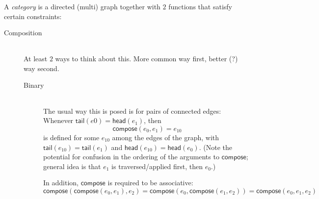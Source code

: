 \documentclass[11pt,openany]{article}
\begin{document}
A \textit{category} is a directed (multi) graph 
together with $2$ functions that satisfy certain constraints:
\begin{description}
\item[Composition]\mbox{}\\
At least $2$ ways to think about this. 
More common way first, better (?) way second.
\begin{description}
\item[Binary]\mbox{}\\
The usual way this is posed is for pairs of connected edges:
Whenever $\mathsf{tail}(e0) = \mathsf{head}(e_1)$,
then
\[ \mathsf{compose}(e_0,e_1) = e_{10} \]
is defined
for some $e_{10}$ among the edges of the graph,
with $\mathsf{tail}(e_{10}) = \mathsf{tail}(e_1)$
and $\mathsf{head}(e_{10}) = \mathsf{head}(e_0)$.
(Note the potential for confusion 
in the ordering of the arguments to $\mathsf{compose}$;
general idea is that $e_1$ is traversed/applied first,
then $e_0$.)
\par
In addition, $\mathsf{compose}$ is required to be associative:
\[
\mathsf{compose}(\mathsf{compose}(e_0,e_1),e_2) 
= \mathsf{compose}(e_0,\mathsf{compose}(e_1,e_2))
= \mathsf{compose}(e_0,e_1,e_2)
\]


\end{description}
\end{description}
\end{document}
